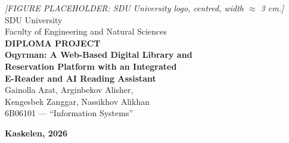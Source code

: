 \documentclass[12pt,a4paper]{report}
\begin{document}

\begin{titlepage}
    \begin{center}
        \vspace*{15mm}
        \textit{[FIGURE PLACEHOLDER: SDU University logo, centred, width $\approx$ 3 cm.]}\\[10mm]
        {\large SDU University}\\[2mm]
        {\large Faculty of Engineering and Natural Sciences}\\[40mm]

        {\Huge \textbf{DIPLOMA PROJECT}}\\[12mm]
        {\Large \textbf{Oqyrman: A Web-Based Digital Library and\\
        Reservation Platform with an Integrated\\
        E-Reader and AI Reading Assistant}}\\[20mm]

        {\large Gainolla Azat, Arginbekov Alisher,\\
        Kengesbek Zanggar, Nassikhov Alikhan}\\[6mm]
        {\large 6B06101 --- ``Information Systems''}

        \vfill
        \textbf{Kaskelen, 2026}
    \end{center}
\end{titlepage}
\end{document}
